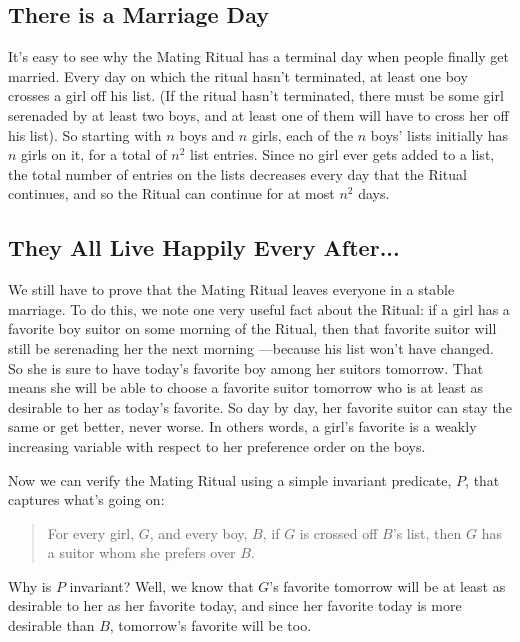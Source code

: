 \subsection{There is a Marriage Day}

It's easy to see why the Mating Ritual has a terminal day when people
finally get married.  Every day on which the ritual hasn't terminated, at
least one boy crosses a girl off his list.  (If the ritual hasn't
terminated, there must be some girl serenaded by at least two boys, and at
least one of them will have to cross her off his list).  So starting with
$n$ boys and $n$ girls, each of the $n$ boys' lists initially has $n$
girls on it, for a total of $n^2$ list entries.  Since no girl ever gets
added to a list, the total number of entries on the lists decreases every
day that the Ritual continues, and so the Ritual can continue for at most
$n^2$ days.

\subsection{They All Live Happily Every After...}

We still have to prove that the Mating Ritual leaves everyone in a
stable marriage.  To do this, we note one very useful fact about the
Ritual: if a girl has a favorite boy suitor on some morning of the Ritual,
then that favorite suitor will still be serenading her the next morning
---because his list won't have changed.  So she is sure to have today's
favorite boy among her suitors tomorrow.  That means she will be able to
choose a favorite suitor tomorrow who is at least as desirable to her as
today's favorite.  So day by day, her favorite suitor can stay the same or
get better, never worse.  In others words, a girl's favorite is a weakly
increasing variable with respect to her preference order on the boys.

Now we can verify the Mating Ritual using a simple invariant predicate,
$P$, that captures what's going on:
\begin{quotation}
  For every girl, $G$, and every boy, $B$, if $G$ is crossed off $B$'s
  list, then $G$ has a suitor whom she prefers over $B$.
\end{quotation}

Why is $P$ invariant?  Well, we know that $G$'s favorite tomorrow will be
at least as desirable to her as her favorite today, and since her favorite
today is more desirable than $B$, tomorrow's favorite will be too.

